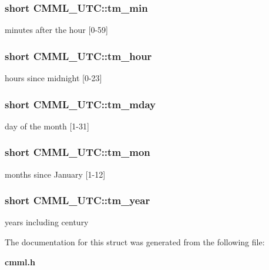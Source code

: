 \subsubsection{\setlength{\rightskip}{0pt plus 5cm}short {\bf CMML\_\-UTC::tm\_\-min}}\label{structCMML__UTC_o2}


minutes after the hour [0-59] 
\subsubsection{\setlength{\rightskip}{0pt plus 5cm}short {\bf CMML\_\-UTC::tm\_\-hour}}\label{structCMML__UTC_o3}


hours since midnight [0-23] 
\subsubsection{\setlength{\rightskip}{0pt plus 5cm}short {\bf CMML\_\-UTC::tm\_\-mday}}\label{structCMML__UTC_o4}


day of the month [1-31] 
\subsubsection{\setlength{\rightskip}{0pt plus 5cm}short {\bf CMML\_\-UTC::tm\_\-mon}}\label{structCMML__UTC_o5}


months since January [1-12] 
\subsubsection{\setlength{\rightskip}{0pt plus 5cm}short {\bf CMML\_\-UTC::tm\_\-year}}\label{structCMML__UTC_o6}


years including century 

The documentation for this struct was generated from the following file:\begin{CompactItemize}
\item 
{\bf cmml.h}\end{CompactItemize}
